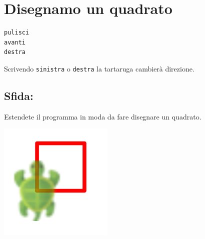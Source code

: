\chapter{Disegnamo un quadrato}
\begin{multicols}{2}

\begin{lstlisting}[basicstyle={\ttfamily\fontsize{30}{36}\selectfont},numbers=none]
pulisci
avanti
destra
\end{lstlisting}
        
 Scrivendo \lstinline{sinistra} o \lstinline{destra} la tartaruga cambierà direzione.
\section*{\color{BrickRed}Sfida:}
Estendete il programma in moda da fare disegnare un quadrato.

\columnbreak

\begin{center}
\includegraphics{../img/square.png}
\end{center}

\end{multicols}


